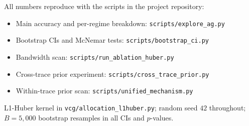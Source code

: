 \documentclass[11pt]{article}
\begin{document}
All numbers reproduce with the scripts in the project repository:
\begin{itemize}[nosep]
\item Main accuracy and per-regime breakdown: \texttt{scripts/explore\_ag.py}
\item Bootstrap CIs and McNemar tests: \texttt{scripts/bootstrap\_ci.py}
\item Bandwidth scan: \texttt{scripts/run\_ablation\_huber.py}
\item Cross-trace prior experiment: \texttt{scripts/cross\_trace\_prior.py}
\item Within-trace prior scan: \texttt{scripts/unified\_mechanism.py}
\end{itemize}
L1-Huber kernel in \texttt{vcg/allocation\_l1huber.py};
random seed $42$ throughout; $B = 5{,}000$ bootstrap resamples in all CIs
and $p$-values.
\end{document}
